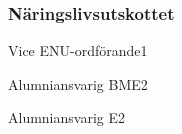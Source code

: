 \documentclass[10pt]{article}
\begin{document}
    \newpage 

    \subsubsection{Näringslivsutskottet}
    \begin{vallista}
        \begin{post}{Vice ENU-ordförande}{1}
        \end{post}
        \begin{post}{Alumniansvarig BME}{2}
            \vakant
            \vakant
        \end{post}
        \begin{post}{Alumniansvarig E}{2}
        \end{post} 
    \end{vallista}
    
\end{document}
